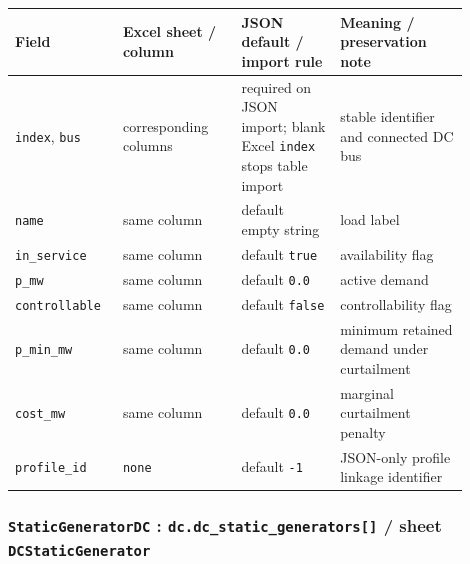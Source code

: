 \begin{longtable}{L{0.20\linewidth}L{0.24\linewidth}L{0.20\linewidth}L{0.26\linewidth}}
\toprule
Field & Excel sheet / column & JSON default / import rule & Meaning / preservation note \\
\midrule
\endhead
\texttt{index}, \texttt{bus} & corresponding columns & required on JSON import; blank Excel \texttt{index} stops table import & stable identifier and connected DC bus \\
\texttt{name} & same column & default empty string & load label \\
\texttt{in\_service} & same column & default \texttt{true} & availability flag \\
\texttt{p\_mw} & same column & default \texttt{0.0} & active demand \\
\texttt{controllable} & same column & default \texttt{false} & controllability flag \\
\texttt{p\_min\_mw} & same column & default \texttt{0.0} & minimum retained demand under curtailment \\
\texttt{cost\_mw} & same column & default \texttt{0.0} & marginal curtailment penalty \\
\texttt{profile\_id} & \texttt{none} & default \texttt{-1} & JSON-only profile linkage identifier \\
\bottomrule
\end{longtable}

\subsubsection*{\texttt{StaticGeneratorDC} : \texttt{dc.dc\_static\_generators[]} / sheet \texttt{DCStaticGenerator}}

